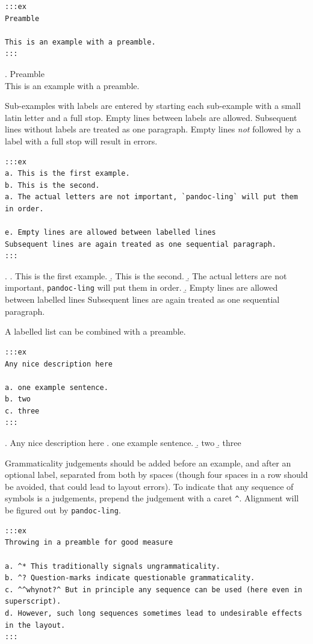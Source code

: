 \documentclass[
]{article}
\begin{document}
\begin{verbatim}
:::ex
Preamble

This is an example with a preamble.
:::
\end{verbatim}

\ex. \label{ling-ex:4.3} Preamble\\
  This is an example with a preamble.

Sub-examples with labels are entered by starting each sub-example with a
small latin letter and a full stop. Empty lines between labels are
allowed. Subsequent lines without labels are treated as one paragraph.
Empty lines \emph{not} followed by a label with a full stop will result
in errors.

\begin{verbatim}
:::ex
a. This is the first example.
b. This is the second.
a. The actual letters are not important, `pandoc-ling` will put them in order.

e. Empty lines are allowed between labelled lines
Subsequent lines are again treated as one sequential paragraph.
:::
\end{verbatim}

\ex. \label{ling-ex:4.4} 
  \a. This is the first example.
  \b. This is the second.
  \b. The actual letters are not important, \texttt{pandoc-ling} will
put them in order.
  \b. Empty lines are allowed between labelled lines Subsequent lines
are again treated as one sequential paragraph.

A labelled list can be combined with a preamble.

\begin{verbatim}
:::ex
Any nice description here

a. one example sentence.
b. two
c. three
:::
\end{verbatim}

\ex. \label{ling-ex:4.5} Any nice description here
  \a. one example sentence.
  \b. two
  \b. three

Grammaticality judgements should be added before an example, and after
an optional label, separated from both by spaces (though four spaces in
a row should be avoided, that could lead to layout errors). To indicate
that any sequence of symbols is a judgements, prepend the judgement with
a caret \texttt{\^{}}. Alignment will be figured out by
\texttt{pandoc-ling}.

\begin{verbatim}
:::ex
Throwing in a preamble for good measure

a. ^* This traditionally signals ungrammaticality.
b. ^? Question-marks indicate questionable grammaticality.
c. ^^whynot?^ But in principle any sequence can be used (here even in superscript).
d. However, such long sequences sometimes lead to undesirable effects in the layout.
:::
\end{verbatim}
\end{document}
